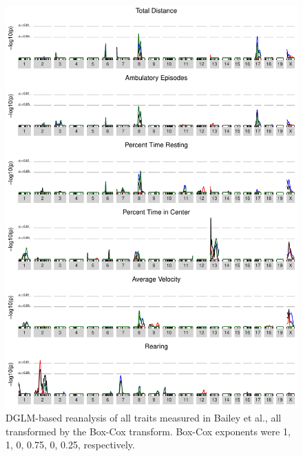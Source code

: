         \newpage
        \begin{figure}
            \includegraphics[height=0.9\textheight]{images/bailey_scans_bc.pdf}
            \caption{DGLM-based reanalysis of all traits measured in Bailey et al., all transformed by the Box-Cox transform.  Box-Cox exponents were 1, 1, 0, 0.75, 0, 0.25, respectively.}
            \label{fig:Bailey_bc_scans}
        \end{figure}

